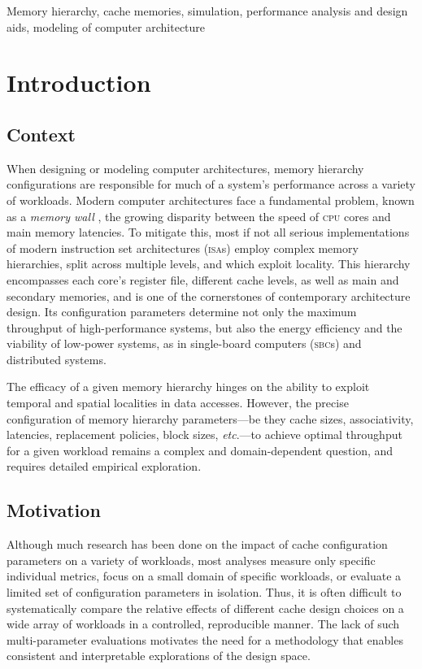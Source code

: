 \documentclass[conference]{IEEEtran}
\begin{document}
\begin{IEEEkeywords}
    Memory hierarchy, cache memories, simulation, performance analysis and
    design aids, modeling of computer architecture
\end{IEEEkeywords}

\section{Introduction}
\subsection{Context}

When designing or modeling computer architectures, memory hierarchy
configurations are responsible for much of a system's performance across a
variety of workloads. Modern computer architectures face a fundamental problem,
known as a \textit{memory wall} \cite{wulf:1995}, the growing disparity between
the speed of \textsc{cpu} cores and main memory latencies. To mitigate this,
most if not all serious implementations of modern instruction set architectures
(\textsc{isa}s) employ complex memory hierarchies, split across multiple
levels, and which exploit locality. This hierarchy encompasses each core's
register file, different cache levels, as well as main and secondary memories,
and is one of the cornerstones of contemporary architecture design. Its
configuration parameters determine not only the maximum throughput of
high-performance systems, but also the energy efficiency and the viability of
low-power systems, as in single-board computers (\textsc{sbc}s) and distributed
systems.

The efficacy of a given memory hierarchy hinges on the ability to exploit
temporal and spatial localities in data accesses. However, the precise
configuration of memory hierarchy parameters---be they cache sizes,
associativity, latencies, replacement policies, block sizes, \textit{etc}.---to
achieve optimal throughput for a given workload remains a complex and
domain-dependent question, and requires detailed empirical exploration.

\subsection{Motivation}

Although much research has been done on the impact of cache configuration
parameters on a variety of workloads, most analyses measure only specific
individual metrics, focus on a small domain of specific workloads, or evaluate
a limited set of configuration parameters in isolation. Thus, it is often
difficult to systematically compare the relative effects of different cache
design choices on a wide array of workloads in a controlled, reproducible
manner. The lack of such multi-parameter evaluations motivates the need for a
methodology that enables consistent and interpretable explorations of the
design space.
\end{document}
